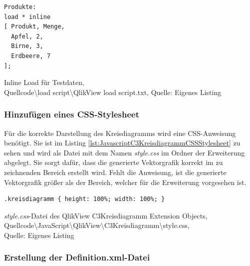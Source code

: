 \begin{listing}[htbp]
\begin{verbatim}
Produkte:
load * inline
[ Produkt, Menge,
  Apfel, 2,
  Birne, 3,
  Erdbeere, 7
];
\end{verbatim}
\caption[Inline Load für Testdaten]{Inline Load für Testdaten, \\Quellcode\textbackslash{}load script\textbackslash{}QlikView load script.txt, Quelle: Eigenes Listing}
\label{lst:InlineLoadFuerTestdaten}
\end{listing}

\subsubsection{Hinzufügen eines CSS-Stylesheet}
\label{lab:HinzufügenEinesCSSStylesheet}

Für die korrekte Darstellung des Kreis\-diagramms wird eine CSS-Anweisung benötigt. Sie ist im Listing \ref{lst:JavascriptC3KreisdiagrammCSSStylesheet} zu sehen und wird als Datei mit dem Namen \textit{style.css} im Ordner der Erweiterung abgelegt. Sie sorgt dafür, dass die generierte Vektorgrafik korrekt im zu zeichnenden Bereich erstellt wird. Fehlt die Anweisung, ist die generierte Vektorgrafik größer als der Bereich, welcher für die Erweiterung vorgesehen ist.

\begin{listing}[htbp]
\begin{verbatim}
.kreisdiagramm { height: 100%; width: 100%; }
\end{verbatim}
\caption[\textit{style.css}-Datei des QlikView C3Kreisdiagramm Extension Objects]{\textit{style.css}-Datei des QlikView C3Kreisdiagramm Extension Objects, \\Quellcode\textbackslash{}JavaScript\textbackslash{}QlikView\textbackslash{}C3Kreisdiagramm\textbackslash{}style.css, \\Quelle: Eigenes Listing}
\label{lst:JavascriptC3KreisdiagrammCSSStylesheet}
\end{listing}

\subsubsection{Erstellung der Definition.xml-Datei}

